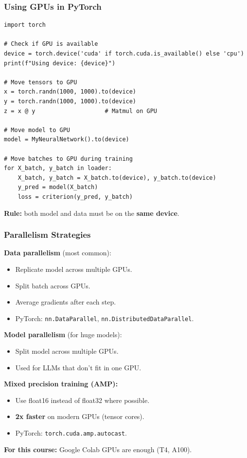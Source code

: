 \documentclass[notes,11pt, aspectratio=169]{beamer}
\begin{document}
\begin{frame}[fragile]
\frametitle{Using GPUs in PyTorch}

\begin{lstlisting}
import torch

# Check if GPU is available
device = torch.device('cuda' if torch.cuda.is_available() else 'cpu')
print(f"Using device: {device}")

# Move tensors to GPU
x = torch.randn(1000, 1000).to(device)
y = torch.randn(1000, 1000).to(device)
z = x @ y                    # Matmul on GPU

# Move model to GPU
model = MyNeuralNetwork().to(device)

# Move batches to GPU during training
for X_batch, y_batch in loader:
    X_batch, y_batch = X_batch.to(device), y_batch.to(device)
    y_pred = model(X_batch)
    loss = criterion(y_pred, y_batch)
\end{lstlisting}

\textbf{Rule:} both model and data must be on the \textbf{same device}.
\end{frame}

\begin{frame}
\frametitle{Parallelism Strategies}

\textbf{Data parallelism} (most common):
\begin{itemize}
    \item Replicate model across multiple GPUs.
    \item Split batch across GPUs.
    \item Average gradients after each step.
    \item PyTorch: \texttt{nn.DataParallel}, \texttt{nn.DistributedDataParallel}.
\end{itemize}

\vspace{6pt}
\textbf{Model parallelism} (for huge models):
\begin{itemize}
    \item Split model across multiple GPUs.
    \item Used for LLMs that don't fit in one GPU.
\end{itemize}

\vspace{6pt}
\textbf{Mixed precision training (AMP):}
\begin{itemize}
    \item Use float16 instead of float32 where possible.
    \item \textbf{2x faster} on modern GPUs (tensor cores).
    \item PyTorch: \texttt{torch.cuda.amp.autocast}.
\end{itemize}

\vspace{6pt}
\textbf{For this course:} Google Colab GPUs are enough (T4, A100).
\end{frame}
\end{document}
